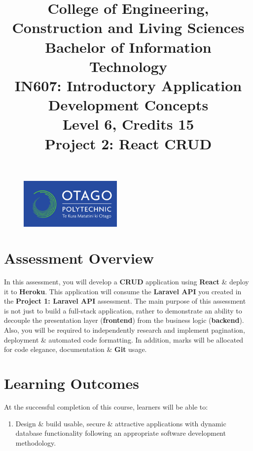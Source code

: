 \documentclass{article}
\author{}
\begin{document}
\begin{figure}
	\centering
	\includegraphics[width=50mm]{../img/logo.png}
\end{figure}

\title{College of Engineering, Construction and Living Sciences\\Bachelor of Information Technology\\IN607: Introductory Application Development Concepts\\Level 6, Credits 15\\\textbf{Project 2: React CRUD}}
\date{}
\maketitle

\section*{Assessment Overview}
In this assessment, you will develop a \textbf{CRUD} application using \textbf{React} \& deploy it to \textbf{Heroku}. This application will consume the \textbf{Laravel API} you created in the \textbf{Project 1: Laravel API} assessment. The main purpose of this assessment is not just to build a full-stack application, rather to demonstrate an ability to decouple the presentation layer (\textbf{frontend}) from the business logic (\textbf{backend}). Also, you will be required to independently research and implement pagination, deployment \& automated code formatting. In addition, marks will be allocated for code elegance, documentation \& \textbf{Git} usage.

\section*{Learning Outcomes}
At the successful completion of this course, learners will be able to:
\begin{enumerate}
	\item Design \& build usable, secure \& attractive applications with dynamic database functionality following an appropriate software development methodology.
\end{enumerate}
\end{document}
